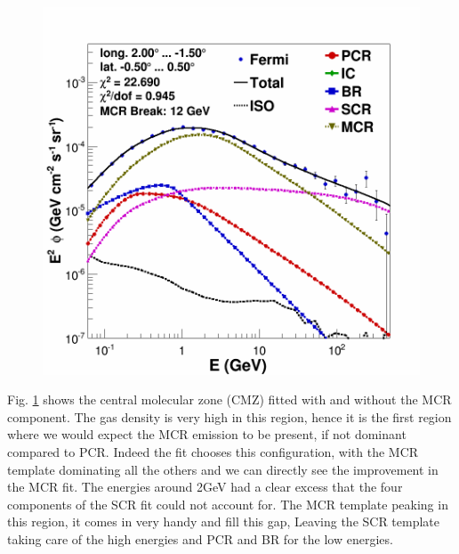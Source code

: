\begin{figure}[h]
\begin{minipage}[h]{0.45\textwidth}
	  \includegraphics[width=\linewidth]{pic/results/MCRonly_CMZ.png}
  	  \label{fig:MCRonly_CMZ}
  \end{minipage}
  \label{fig:MCR_vs_SCRonly_CMZ}
\end{figure}

Fig. \ref{fig:MCR_vs_SCRonly_CMZ} shows the central molecular zone (CMZ) fitted with and without the MCR component. The gas density is very high in this region, hence it is the first region where we would expect the MCR emission to be present, if not dominant compared to PCR. Indeed the fit chooses this configuration, with the MCR template dominating all the others and we can directly see the improvement in the MCR fit. The energies around 2GeV had a clear excess that the four components of the SCR fit could not account for. The MCR template peaking in this region, it comes in very handy and fill this gap, Leaving the SCR template taking care of the high energies and PCR and BR for the low energies. 




